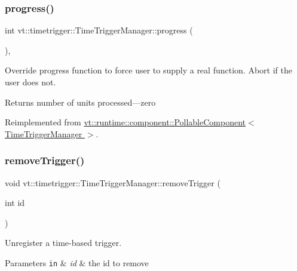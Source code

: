 \subsubsection{\texorpdfstring{progress()}{progress()}}
{\footnotesize\ttfamily int vt\+::timetrigger\+::\+Time\+Trigger\+Manager\+::progress (\begin{DoxyParamCaption}{ }\end{DoxyParamCaption})\hspace{0.3cm}{\ttfamily [override]}, {\ttfamily [virtual]}}



Override progress function to force user to supply a real function. Abort if the user does not. 

\begin{DoxyReturn}{Returns}
number of units processed---zero 
\end{DoxyReturn}


Reimplemented from \hyperlink{structvt_1_1runtime_1_1component_1_1_pollable_component_a34cad810026224d550cd9b0c9d1eff22}{vt\+::runtime\+::component\+::\+Pollable\+Component$<$ Time\+Trigger\+Manager $>$}.

\mbox{\label{structvt_1_1timetrigger_1_1_time_trigger_manager_ae6bdddd787aa88b714686270587e1ff5}} 
\subsubsection{\texorpdfstring{remove\+Trigger()}{removeTrigger()}}
{\footnotesize\ttfamily void vt\+::timetrigger\+::\+Time\+Trigger\+Manager\+::remove\+Trigger (\begin{DoxyParamCaption}\item[{int}]{id }\end{DoxyParamCaption})}



Unregister a time-\/based trigger. 


\begin{DoxyParams}[1]{Parameters}
\mbox{\tt in}  & {\em id} & the {\ttfamily id} to remove \\
\hline
\end{DoxyParams}
\mbox{\label{structvt_1_1timetrigger_1_1_time_trigger_manager_a57c2be01d872ed68e2261786468e3979}} 

